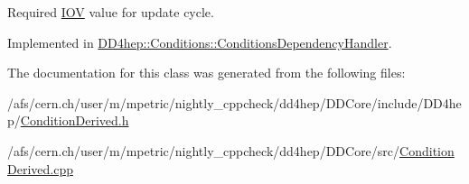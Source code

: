 Required \hyperlink{class_d_d4hep_1_1_i_o_v}{IOV} value for update cycle. 

Implemented in \hyperlink{class_d_d4hep_1_1_conditions_1_1_conditions_dependency_handler_a402d7a0ab3c92562382b8595205efd86}{DD4hep::Conditions::ConditionsDependencyHandler}.

The documentation for this class was generated from the following files:\begin{DoxyCompactItemize}
\item 
/afs/cern.ch/user/m/mpetric/nightly\_\-cppcheck/dd4hep/DDCore/include/DD4hep/\hyperlink{_condition_derived_8h}{ConditionDerived.h}\item 
/afs/cern.ch/user/m/mpetric/nightly\_\-cppcheck/dd4hep/DDCore/src/\hyperlink{_condition_derived_8cpp}{ConditionDerived.cpp}\end{DoxyCompactItemize}
